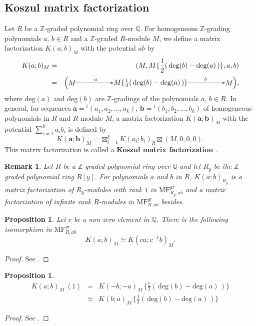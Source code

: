 \documentclass[10pt]{amsart}
\theoremstyle{break}
\newtheorem{pro}[de]{Proposition}
\newtheorem{rem}[de]{Remark}
\begin{document}
\subsection{Koszul matrix factorization}
Let $R$ be a ${{\mathbb{Z}}}$-graded polynomial ring over ${{\mathbb{Q}}}$. 
For homogeneous ${{\mathbb{Z}}}$-grading polynomials $a$, $b \in R$ and a ${{\mathbb{Z}}}$-graded $R$-module $M$, 
we define a matrix factorization $ K(a;b)_{M} $
with the potential $a b$ by
\begin{eqnarray*}
K(a;b)_{M}&=& 
(M,M\{ \frac{1}{2}(\, {{\mathrm{deg}}} (b)-{{\mathrm{deg}}} (a)\, )\},a,b)\\
&=& 
\Big(
\xymatrix{
*{M}\ar[rr]^(.3){a}&&*{M\{ \frac{1}{2}(\, {{\mathrm{deg}}} (b)-{{\mathrm{deg}}} (a)\, )\}}\ar[rr]^(.7){b}&&*{M}
}
\Big)
,
\end{eqnarray*}
where ${{\mathrm{deg}}} (a)$ and ${{\mathrm{deg}}} (b)$ are ${{\mathbb{Z}}}$-gradings of the polynomials $a$, $b \in R$.
In general, for sequences $\mathbf{a}={}^t(a_1, a_2, \ldots, a_k)$, $\mathbf{b}={}^t(b_1, b_2, \ldots, b_k)$ of homogeneous polynomials in $R$ and $R$-module $M$, 
a matrix factorization $K\left( \mathbf{a} ; \mathbf{b} \right)_{M}$ with the potential $\sum_{i=1}^k a_i b_i$ is defined by 
\[
K\left( \mathbf{a} ; \mathbf{b} \right)_{M}
=
\mathop{\boxtimes}_{i=1}^k K(a_i;b_i)_{R}\boxtimes(M,0,0,0)
.
\]
This matrix factorization is called a {\bf Koszul matrix factorization} \cite{KR1}.
\begin{rem}
Let $R$ be a ${{\mathbb{Z}}}$-graded polynomial ring over ${{\mathbb{Q}}}$ and let $R_y$ be the ${{\mathbb{Z}}}$-graded polynomial ring $R[y]$. For polynomials $a$ and $b$ in $R$,
$K(a;b)_{R_y}$ is a matrix factorization of $R_y$-modules with rank $1$ in ${{\mathrm{MF}}}^{gr}_{R_y,ab}$ 
and a matrix factorization of infinite rank $R$-modules in ${{\mathrm{MF}}}^{gr}_{R,ab}$ besides.
\end{rem}
\begin{pro}\label{equiv2}
Let $c$ be a non-zero element in ${{\mathbb{Q}}}$.
There is the following isomorphism in ${{\mathrm{MF}}}^{gr}_{R,a b}$
$$
K(a;b)_M \simeq K(c a;c^{-1} b)_M. 
$$
\end{pro}
\begin{proof}
See \cite{Yone1}.
\end{proof}
\begin{pro}\label{functor2}
\begin{eqnarray*}
K(a;b)_{M}\,\left< 1 \right> &=& K(-b;-a)_{M}\,\{ \frac{1}{2}(\, {{\mathrm{deg}}} (b) -{{\mathrm{deg}}} (a)\, ) \} \\[-0.1em]
&\simeq&K(b;a)_{M}\,\{ \frac{1}{2}(\, {{\mathrm{deg}}} (b) -{{\mathrm{deg}}} (a)\, ) \} 
\end{eqnarray*}
\end{pro}
\begin{proof}
See \cite{Yone1}.
\end{proof}
\end{document}
